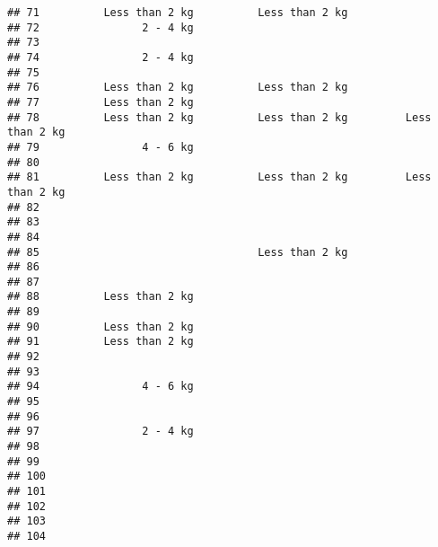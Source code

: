 \documentclass[
]{article}
\begin{document}
\begin{verbatim}
## 71          Less than 2 kg          Less than 2 kg                       
## 72                2 - 4 kg                                               
## 73                                                                       
## 74                2 - 4 kg                                               
## 75                                                                       
## 76          Less than 2 kg          Less than 2 kg                       
## 77          Less than 2 kg                                               
## 78          Less than 2 kg          Less than 2 kg         Less than 2 kg
## 79                4 - 6 kg                                               
## 80                                                                       
## 81          Less than 2 kg          Less than 2 kg         Less than 2 kg
## 82                                                                       
## 83                                                                       
## 84                                                                       
## 85                                  Less than 2 kg                       
## 86                                                                       
## 87                                                                       
## 88          Less than 2 kg                                               
## 89                                                                       
## 90          Less than 2 kg                                               
## 91          Less than 2 kg                                               
## 92                                                                       
## 93                                                                       
## 94                4 - 6 kg                                               
## 95                                                                       
## 96                                                                       
## 97                2 - 4 kg                                               
## 98                                                                       
## 99                                                                       
## 100                                                                      
## 101                                                                      
## 102                                                                      
## 103                                                                      
## 104                                                                      

\end{verbatim}
\end{document}
